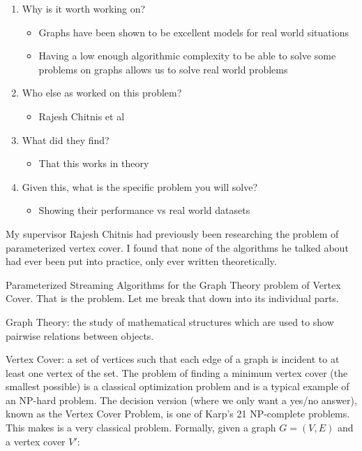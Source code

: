 \begin{enumerate}
\begin{itemize}
    \end{itemize}
    \item Why is it worth working on?
    \begin{itemize}
        \item Graphs have been shown to be excellent models for real world situations
        \item Having a low enough algorithmic complexity to be able to solve some problems on graphs allows us to solve real world problems
    \end{itemize}
    \item Who else as worked on this problem?
    \begin{itemize}
        \item Rajesh Chitnis et al
    \end{itemize}
    \item What did they find?
    \begin{itemize}
        \item That this works in theory
    \end{itemize}
    \item Given this, what is the specific problem you will solve?
    \begin{itemize}
        \item Showing their performance vs real world datasets
    \end{itemize}
\end{enumerate}


My supervisor Rajesh Chitnis had previously been researching the problem of parameterized vertex cover. I found that none of the algorithms he talked about had ever been put into practice, only ever written theoretically.

\hrulefill

Parameterized Streaming Algorithms for the Graph Theory problem of Vertex Cover. That is the problem. Let me break that down into its individual parts.

Graph Theory: the study of mathematical structures which are used to show pairwise relations between objects.

Vertex Cover: a set of vertices such that each edge of a graph is incident to at least one vertex of the set. The problem of finding a minimum vertex cover (the smallest possible) is a classical optimization problem and is a typical example of an NP-hard problem. The decision version (where we only want a yes/no answer), known as the Vertex Cover Problem, is one of Karp's 21 NP-complete problems. This makes is a very classical problem. Formally, given a graph \(G = (V, E)\) and a vertex cover \(V'\):

